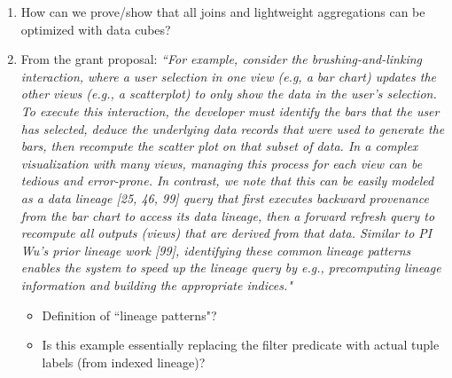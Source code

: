 \begin{enumerate}
	\item How can we prove/show that all joins and lightweight aggregations can be optimized with data cubes?
	\item From the grant proposal: \textit{``For example, consider the brushing-and-linking interaction, where a user selection in one view (e.g, a bar chart) updates the other views (e.g., a scatterplot) to only show the data in the user’s selection. To execute this interaction, the developer must identify the bars that the user has selected, deduce the underlying data records that were used to generate the bars, then recompute the scatter plot on that subset of data. In a complex visualization with many views, managing this process for each view can be tedious and error-prone. In contrast, we note that this can be easily modeled as a data lineage [25, 46, 99] query that first executes backward provenance from the bar chart to access its data lineage, then a forward refresh query to recompute all outputs (views) that are derived from that data. Similar to PI Wu's prior lineage work [99], identifying these common lineage patterns enables the system to speed up the lineage query by e.g., precomputing lineage information and building the appropriate indices."}
	\begin{itemize}
		\item Definition of ``lineage patterns"?
		\item Is this example essentially replacing the filter predicate with actual tuple labels (from indexed lineage)?
	\end{itemize}
\end{enumerate}